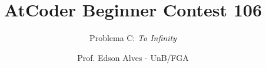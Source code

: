 \title{AtCoder Beginner Contest 106}
\subtitle{Problema C: {\it To Infinity}}
\author{Prof. Edson Alves - UnB/FGA}
\date{}
